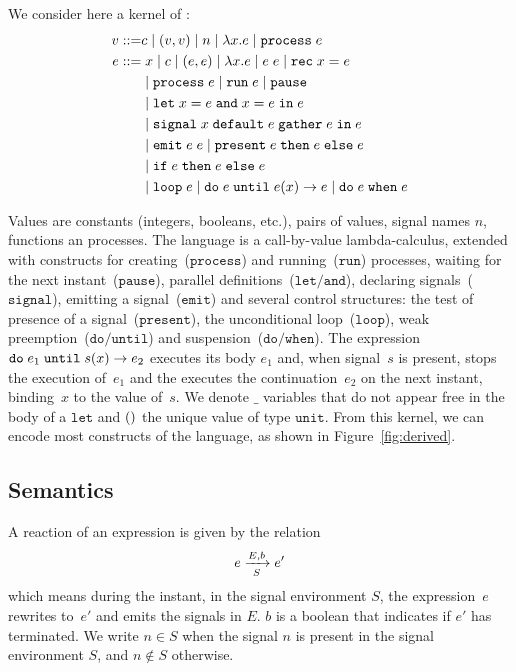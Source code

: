 \documentclass[9pt,preprint]{sigplanconf}
\newcommand{\sdeq}{::=}
\begin{document}
We consider here a kernel of \rml{}:
%
\begin{align*}
v \sdeq & c \mid (v, v) \mid n \mid \elam{x}{e} \mid \eproc{e} \\
e \sdeq &\phantom{\mid}  x \mid c \mid (e, e) \mid \elam{x}{e} 
  \mid \eapp{e}{e} \mid \erec{x}{e} \\
  & \mid \eproc{e} \mid \erun{e} \mid \epause{}  \\
& \mid \eletpar{x}{e}{x}{e}{e} \\
 &\mid \esig{x}{e}{e}{e} \\
 & \mid \eemit{e}{e} \mid \epres{e}{e}{e} \\
 & \mid \eite{e}{e}{e} \\
 &  \mid \eloop{e} \mid \euntil{e}{e}{x}{e} 
   \mid \ewhen{e}{e} 
\end{align*}

Values are constants (integers, booleans, etc.), pairs of values, signal names $n$, functions an processes. The language is a call-by-value lambda-calculus, extended with constructs for creating~($\mathtt{process}$) and running~($\mathtt{run}$) processes, waiting for the next instant~($\mathtt{pause}$), parallel definitions~($\mathtt{let/and}$), declaring signals~($\mathtt{signal}$), emitting a signal~($\mathtt{emit}$) and several control structures: the test of presence of a signal~($\mathtt{present}$), the unconditional loop~($\mathtt{loop}$), weak preemption~($\mathtt{do/until}$) and suspension~($\mathtt{do/when}$).  The expression $\euntil{e_1}{s}{x}{e_2}$ executes its body $e_1$ and, when signal~$s$ is present, stops the execution of~$e_1$ and the executes the continuation~$e_2$ on the next instant, binding~$x$ to the value of~$s$. We denote $\_$ variables that do not appear free in the body of a $\mathtt{let}$ and $\evoid{}$ the unique value of type $\mathtt{unit}$. From this kernel, we can encode most constructs of the language, as shown in Figure~\ref{fig:derived}.

\subsection{Semantics}

A reaction of an expression is given by the relation
\[  \bigstep{N}{e}{e'}{E}{b}{S} \]
which means during the instant, in the signal environment $S$, the expression~$e$ rewrites to~$e'$ and emits the signals in $E$. $b$ is a boolean that indicates if $e'$ has terminated. We write $n \in S$ when the signal $n$ is present in the signal environment $S$, and $n \not\in S$ otherwise.
\end{document}
